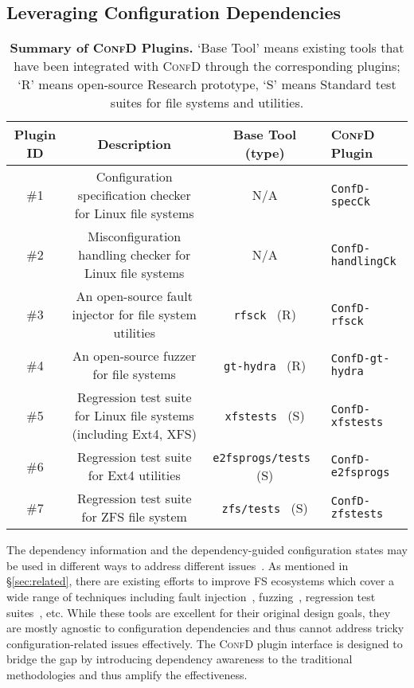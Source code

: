 \subsection{Leveraging Configuration Dependencies}
\label{sec:leverage}    
\label{sec:plugins}



\begin{table*}[t]
	\small
	\begin{center}
		\begin{tabular}{ c | c | c | l  }
 	\textbf{Plugin ID}  & \textbf{Description}  & \textbf{Base Tool (type)}  & \textbf{\textsc{ConfD} Plugin} \\
 	\hline
 	\#1   & Configuration specification checker for Linux file systems   & N/A &  \texttt{ConfD-specCk} \\
 				\hline
	\#2     & Misconfiguration handling checker for Linux file systems     & N/A & \texttt{ConfD-handlingCk}\\
				\hline
			\#3    & An open-source fault injector for file system  utilities & 
 \texttt{rfsck}~\cite{OmFAST18} (R) & \texttt{ConfD-rfsck}   \\
          \hline
\#4   & An open-source fuzzer for file systems & \texttt{gt-hydra}~\cite{hydra-2019} (R)  & \texttt{ConfD-gt-hydra}  \\

	\hline
	
 \#5  &  Regression test suite for Linux file systems (including Ext4, XFS)  & \texttt{xfstests}~\cite{xfstest} (S)  & \texttt{ConfD-xfstests}\\
			\hline
\#6    & Regression test suite for Ext4 utilities & \texttt{e2fsprogs/tests}~\cite{e2fsprogs-test} (S)  & \texttt{ConfD-e2fsprogs}  \\
			\hline
\#7    & Regression test suite for ZFS file system & \texttt{zfs/tests}~\cite{zfs} (S)  & \texttt{ConfD-zfstests}  \\
                \hline
		\end{tabular}
	\end{center}
	\caption{ {\bf Summary of \textsc{ConfD} Plugins.} `Base Tool'  means existing tools that have been integrated with \textsc{ConfD} through the corresponding plugins; `R' means open-source Research prototype, `S' means Standard test suites for file systems and utilities.
}
	\label{tab:plugins}
\end{table*}

The dependency information and the dependency-guided configuration states may be used in different ways  to address different issues~\cite{Conferr-DSN08,spex,cdep}.  
As mentioned in \S\ref{sec:related},    there are existing efforts to improve FS ecosystems which cover a wide range of techniques including fault injection~\cite{iron05,OmFAST18}, fuzzing~\cite{xu2019fuzzing,hydra-2019}, regression test suites~\cite{xfstest,e2fsprogs-test},  etc.
While these tools are excellent for their original design goals, they are mostly agnostic to configuration dependencies and thus cannot address tricky configuration-related issues  effectively. 
The \textsc{ConfD} plugin interface is designed to bridge the gap by introducing dependency awareness to the traditional methodologies and thus amplify the effectiveness.

